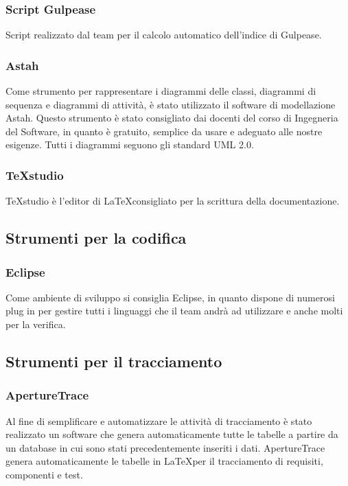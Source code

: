 \subsubsection{Script Gulpease}
\label{}
Script realizzato dal team per il calcolo automatico dell'indice di Gulpease.

\subsubsection{Astah}
Come strumento per rappresentare i diagrammi delle classi, diagrammi di sequenza e diagrammi di attivit\`{a}, è stato utilizzato il software di modellazione Astah. Questo strumento è stato consigliato dai docenti del corso di Ingegneria del Software, in quanto è gratuito, semplice da usare e adeguato alle nostre esigenze. Tutti i diagrammi seguono gli standard UML 2.0.

\subsubsection{TeXstudio}
TeXstudio è l'editor di \LaTeX consigliato per la scrittura della documentazione.

\subsection{Strumenti per la codifica}
\subsubsection{Eclipse}
Come ambiente di sviluppo si consiglia Eclipse, in quanto dispone di numerosi plug in per gestire tutti i linguaggi che il team andrà ad utilizzare e anche molti per la verifica.


\subsection{Strumenti per il tracciamento}

\subsubsection{ApertureTrace}
\label{ApertureTrace}
Al fine di semplificare e automatizzare le attivit\`{a} di tracciamento è stato realizzato un software che genera automaticamente tutte le tabelle a partire da un database in cui sono stati precedentemente inseriti i dati.
ApertureTrace genera automaticamente le tabelle in \LaTeX per il tracciamento di requisiti, componenti e test.


